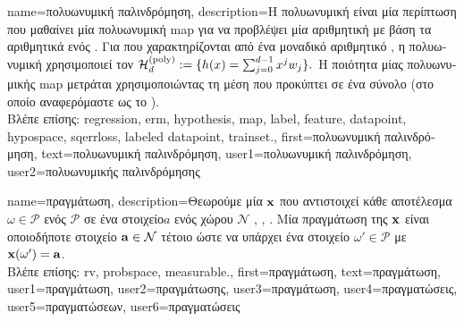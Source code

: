 {name={\foreignlanguage{greek}{πολυωνυμική παλινδρόμηση}}, 
	description={\foreignlanguage{greek}{Η πολυωνυμική} 
		 \foreignlanguage{greek}{είναι μία περίπτωση}  \foreignlanguage{greek}{που 
		μαθαίνει μία πολυωνυμική} \gls{map}  \foreignlanguage{greek}{για να προβλέψει μία αριθμητική} 
		 \foreignlanguage{greek}{με βάση τα αριθμητικά}  \foreignlanguage{greek}{ενός} 
		. \foreignlanguage{greek}{Για}  \foreignlanguage{greek}{που 
		χαρακτηρίζονται από ένα μοναδικό αριθμητικό} , 
		\foreignlanguage{greek}{η πολυωνυμική}  \foreignlanguage{greek}{χρησιμοποιεί τον}  
		$\mathcal{H}^{(\rm poly)}_{d} := \{ h(x) = \sum_{j=0}^{d-1} x^{j} w_{j} \}.$
		\foreignlanguage{greek}{Η ποιότητα μίας πολυωνυμικής} \gls{map}  \foreignlanguage{greek}{μετράται 
		χρησιμοποιώντας τη μέση}  \foreignlanguage{greek}{που προκύπτει σε ένα σύνολο} 
		 (\foreignlanguage{greek}{στο οποίο αναφερόμαστε ως το} ).\\
		\foreignlanguage{greek}{Βλέπε επίσης:} \gls{regression}, \gls{erm}, \gls{hypothesis}, \gls{map}, \gls{label}, \gls{feature}, \gls{datapoint}, 
		\gls{hypospace}, \gls{sqerrloss}, \gls{labeled datapoint}, \gls{trainset}.},
	first={\foreignlanguage{greek}{πολυωνυμική παλινδρόμηση}},
	text={\foreignlanguage{greek}{πολυωνυμική παλινδρόμηση}},
	user1={\foreignlanguage{greek}{πολυωνυμική παλινδρόμηση}}, %
	user2={\foreignlanguage{greek}{πολυωνυμικής παλινδρόμησης}} %
}

{name={\foreignlanguage{greek}{πραγμάτωση}},
	description={\foreignlanguage{greek}{Θεωρούμε μία}  ${\bf x}$ 
		\foreignlanguage{greek}{που αντιστοιχεί κάθε αποτέλεσμα $\omega \in \mathcal{P}$ ενός}  
		$\mathcal{P}$ \foreignlanguage{greek}{σε ένα στοιχείο$a$ ενός}  \foreignlanguage{greek}{χώρου} 
		$\mathcal{N}$ \cite{RudinBookPrinciplesMatheAnalysis}, \cite{BillingsleyProbMeasure}, \cite{HalmosMeasure}. 
		\foreignlanguage{greek}{Μία πραγμάτωση της ${\bf x}$ είναι οποιοδήποτε στοιχείο ${\bf a} \in \mathcal{N}$ τέτοιο ώστε να 
		υπάρχει ένα στοιχείο $\omega' \in \mathcal{P}$ με} ${\bf x}(\omega') = {\bf a}$.\\
		\foreignlanguage{greek}{Βλέπε επίσης:} \gls{rv}, \gls{probspace}, \gls{measurable}.}, 
	first={\foreignlanguage{greek}{πραγμάτωση}},
	text={\foreignlanguage{greek}{πραγμάτωση}},
	user1={\foreignlanguage{greek}{πραγμάτωση}}, %
  	user2={\foreignlanguage{greek}{πραγμάτωσης}}, %
	user3={\foreignlanguage{greek}{πραγμάτωση}}, %
  	user4={\foreignlanguage{greek}{πραγματώσεις}}, %
	user5={\foreignlanguage{greek}{πραγματώσεων}}, %
  	user6={\foreignlanguage{greek}{πραγματώσεις}} %
}


